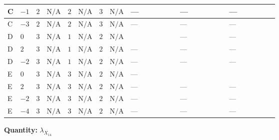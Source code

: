 \documentclass[8pt]{article}
\begin{document}
\begin{landscape}
\begin{longtable}{@{}llcccccc >{\raggedright\arraybackslash}p{0.21\linewidth} >{\raggedright\arraybackslash}p{0.21\linewidth} >{\raggedright\arraybackslash}p{0.21\linewidth}@{}}
C & $-1$ & $2$ & $\text{N/A}$ & $2$ & $\text{N/A}$ & $3$ & $\text{N/A}$ & --- & --- & --- \\
\midrule
C & $-3$ & $2$ & $\text{N/A}$ & $2$ & $\text{N/A}$ & $3$ & $\text{N/A}$ & --- & --- & --- \\
\midrule
D & $0$ & $3$ & $\text{N/A}$ & $1$ & $\text{N/A}$ & $2$ & $\text{N/A}$ & \scriptsize\adjustbox{max width=\linewidth}{$\begin{gathered} +4 {\lambda_{HS_1}^{(A)}} {\lambda_{X_{14}}}\end{gathered}$} & --- & --- \\
\midrule
D & $2$ & $3$ & $\text{N/A}$ & $1$ & $\text{N/A}$ & $2$ & $\text{N/A}$ & --- & --- & --- \\
\midrule
D & $-2$ & $3$ & $\text{N/A}$ & $1$ & $\text{N/A}$ & $2$ & $\text{N/A}$ & --- & --- & --- \\
\midrule
E & $0$ & $3$ & $\text{N/A}$ & $3$ & $\text{N/A}$ & $2$ & $\text{N/A}$ & --- & \scriptsize\adjustbox{max width=\linewidth}{$\begin{gathered} +2 \left({\lambda_5}\right)^{*} (2 \left({\lambda_{X_{5}}^{(1)}}\right)^{*}-\left({\lambda_{X_{5}}^{(2)}}\right)^{*}+4 \left({\lambda_{X_{18}}}\right)^{*})\end{gathered}$} & \scriptsize\adjustbox{max width=\linewidth}{$\begin{gathered} -2 {\lambda_{12}^{(A)}} {\lambda_{X_{14}}}\end{gathered}$} \\
\midrule
E & $2$ & $3$ & $\text{N/A}$ & $3$ & $\text{N/A}$ & $2$ & $\text{N/A}$ & --- & --- & --- \\
\midrule
E & $-2$ & $3$ & $\text{N/A}$ & $3$ & $\text{N/A}$ & $2$ & $\text{N/A}$ & --- & --- & --- \\
\midrule
E & $-4$ & $3$ & $\text{N/A}$ & $3$ & $\text{N/A}$ & $2$ & $\text{N/A}$ & --- & --- & --- \\
\midrule
\bottomrule
\end{longtable}
\clearpage
\noindent\textbf{Quantity: }${\lambda_{X_{14}}}$\par\smallskip

\end{landscape}
\end{document}
